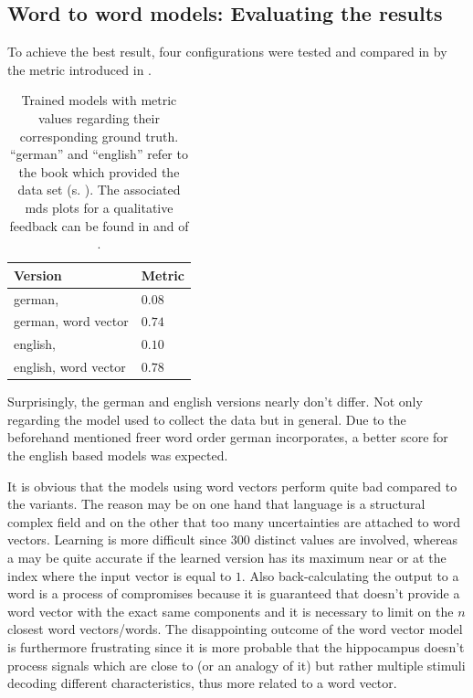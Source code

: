 
\subsection{Word to word models: Evaluating the results} \label{subsec: text model evaluating the results}
To achieve the best result, four configurations were tested and compared in \tabref{\ref{tab: text model versions and metrics}} by the metric introduced in .
\begin{table}
	\centering
	\caption{Trained models with metric values regarding their corresponding ground truth. ``german'' and ``english'' refer to the book which provided the data set (s. ). The associated \gls{mds} plots for a qualitative feedback can be found in \figref{\ref{fig: text model gt de en mds}} and \figref{\ref{fig: text model cumulativ mds plots}} of .}
	\begin{tabular}{ll}
		\toprule
		Version					& Metric \\
		\midrule
		german, \onehot{} 		& $ 0.08 $	\\%
		german, word vector		& $ 0.74 $	\\%
		english, \onehot{}		& $ 0.10 $	\\%
		english, word vector	& $ 0.78 $	\\%
		\bottomrule
	\end{tabular}
	\label{tab: text model versions and metrics}
\end{table}
Surprisingly, the german and english \onehot{} versions nearly don't differ. Not only regarding the model used to collect the data but in general. Due to the beforehand mentioned freer word order german incorporates, a better score for the english based models was expected.

It is obvious that the models using word vectors perform quite bad compared to the \onehot{} variants. The reason may be on one hand that language is a structural complex field and on the other that too many uncertainties are attached to word vectors. Learning is more difficult since $ 300 $ distinct values are involved, whereas a \onehot{} may be quite accurate if the learned version has its maximum near or at the index where the input vector is equal to $ 1 $. Also back-calculating the output to a word is a process of compromises because it is guaranteed that \spacy{} doesn't provide a word vector with the exact same components and it is necessary to limit on the $ n $ closest word vectors/words. The disappointing outcome of the word vector model is furthermore frustrating since it is more probable that the hippocampus doesn't process signals which are close to  (or an analogy of it) but rather multiple stimuli decoding different characteristics, thus more related to a word vector.

